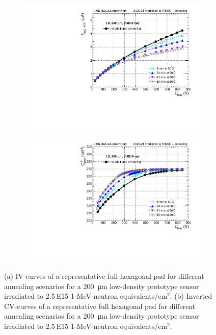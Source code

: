 \begin{figure}
	\captionsetup[subfigure]{aboveskip=-1pt,belowskip=-1pt}
	\centering
	\begin{subfigure}[b]{0.49\textwidth}
		\includegraphics[width=0.999\textwidth]{plots/annealing_iv/annealing_IV_ch24.pdf}
		\subcaption{
		}
		\label{plot:annealing_IV}
	\end{subfigure}
	\hfill
	\begin{subfigure}[b]{0.49\textwidth}
		\includegraphics[width=0.999\textwidth]{plots/annealing_Vdep/annealing_CV_ch24.pdf}
		
		\subcaption{
		}
		\label{plot:annealing_current}
	\end{subfigure}
	\caption{
		(a) IV-curves of a representative full hexagonal pad for different annealing scenarios for a \SI{200}{\micro\metre} low-density prototype sensor irradiated to 2.5$~$E15 1-MeV-neutron equivalents/cm$^{2}$.
        (b) Inverted CV-curves of a representative full hexagonal pad for different annealing scenarios for a \SI{200}{\micro\metre} low-density prototype sensor irradiated to 2.5$~$E15 1-MeV-neutron equivalents/cm$^{2}$.
	}
\end{figure}

